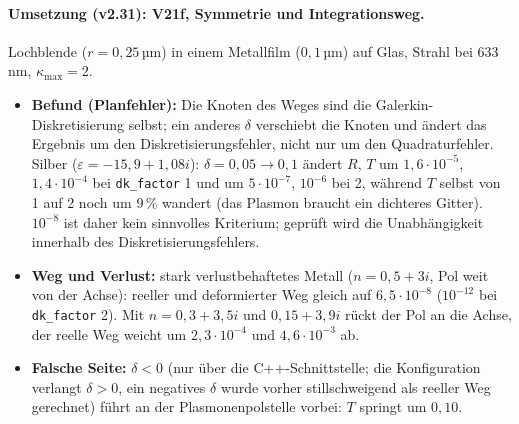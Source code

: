 \paragraph{Umsetzung (v2.31): V21f, Symmetrie und Integrationsweg.}
Lochblende ($r=0{,}25$\,µm) in einem Metallfilm ($0{,}1$\,µm) auf Glas, Strahl bei $633$\,nm, $\kappa_{\max}=2$.
\begin{itemize}[nosep]
  \item \textbf{Befund (Planfehler):} Die Knoten des Weges sind die Galerkin-Diskretisierung selbst; ein anderes
        $\delta$ verschiebt die Knoten und ändert das Ergebnis um den Diskretisierungsfehler, nicht nur um den
        Quadraturfehler. Silber ($\varepsilon=-15{,}9+1{,}08i$): $\delta=0{,}05\to0{,}1$ ändert $R$, $T$ um
        $1{,}6\cdot10^{-5}$, $1{,}4\cdot10^{-4}$ bei \verb|dk_factor| 1 und um $5\cdot10^{-7}$, $10^{-6}$ bei 2, während $T$
        selbst von 1 auf 2 noch um $9\,\%$ wandert (das Plasmon braucht ein dichteres Gitter). $10^{-8}$ ist daher kein
        sinnvolles Kriterium; geprüft wird die Unabhängigkeit innerhalb des Diskretisierungsfehlers.
  \item \textbf{Weg und Verlust:} stark verlustbehaftetes Metall ($n=0{,}5+3i$, Pol weit von der Achse): reeller und
        deformierter Weg gleich auf $6{,}5\cdot10^{-8}$ ($10^{-12}$ bei \verb|dk_factor| 2). Mit $n=0{,}3+3{,}5i$ und
        $0{,}15+3{,}9i$ rückt der Pol an die Achse, der reelle Weg weicht um $2{,}3\cdot10^{-4}$ und $4{,}6\cdot10^{-3}$ ab.
  \item \textbf{Falsche Seite:} $\delta<0$ (nur über die C++-Schnittstelle; die Konfiguration verlangt $\delta>0$, ein
        negatives $\delta$ wurde vorher stillschweigend als reeller Weg gerechnet) führt an der Plasmonenpolstelle
        vorbei: $T$ springt um $0{,}10$.
\end{itemize}

